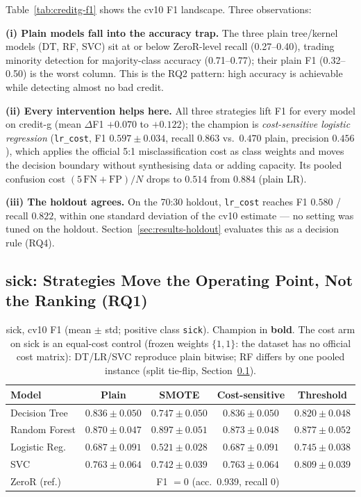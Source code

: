 Table~\ref{tab:creditg-f1} shows the cv10 F1 landscape. Three observations:

\textbf{(i) Plain models fall into the accuracy trap.} The three plain tree/kernel models (DT, RF, SVC) sit at or below ZeroR-level recall (0.27--0.40), trading minority detection for majority-class accuracy (0.71--0.77); their plain F1 (0.32--0.50) is the worst column. This is the RQ2 pattern: high accuracy is achievable while detecting almost no bad credit.

\textbf{(ii) Every intervention helps here.} All three strategies lift F1 for every model on credit-g (mean $\Delta$F1 $+0.070$ to $+0.122$); the champion is \emph{cost-sensitive logistic regression} (\texttt{lr\_cost}, F1 $0.597\pm0.034$, recall $0.863$ vs.\ $0.470$ plain, precision $0.456$), which applies the official 5:1 misclassification cost as class weights and moves the decision boundary without synthesising data or adding capacity. Its pooled confusion cost $(5\,\mathrm{FN}+\mathrm{FP})/N$ drops to $0.514$ from $0.884$ (plain LR).

\textbf{(iii) The holdout agrees.} On the 70:30 holdout, \texttt{lr\_cost} reaches F1 $0.580$ / recall $0.822$, within one standard deviation of the cv10 estimate --- no setting was tuned on the holdout. Section~\ref{sec:results-holdout} evaluates this as a decision rule (RQ4).

\subsection{sick: Strategies Move the Operating Point, Not the Ranking (RQ1)}
\label{sec:results-sick}

\begin{table}[H]
\centering
\caption{sick, cv10 F1 (mean $\pm$ std; positive class \texttt{sick}). Champion in \textbf{bold}. The cost arm on sick is an equal-cost control (frozen weights $\{1,1\}$: the dataset has no official cost matrix): DT/LR/SVC reproduce plain bitwise; RF differs by one pooled instance (split tie-flip, Section~\ref{sec:results-sick}).}
\label{tab:sick-f1}
\begin{tabular}{lcccc}
\toprule
Model & Plain & SMOTE & Cost-sensitive & Threshold \\
\midrule
Decision Tree & $0.836\pm0.050$ & $0.747\pm0.050$ & $0.836\pm0.050$ & $0.820\pm0.048$ \\
Random Forest & $0.870\pm0.047$ & $\mathbf{0.897\pm0.051}$ & $0.873\pm0.048$ & $0.877\pm0.052$ \\
Logistic Reg. & $0.687\pm0.091$ & $0.521\pm0.028$ & $0.687\pm0.091$ & $0.745\pm0.038$ \\
SVC & $0.763\pm0.064$ & $0.742\pm0.039$ & $0.763\pm0.064$ & $0.809\pm0.039$ \\
\midrule
ZeroR (ref.) & \multicolumn{4}{c}{F1 $=0$ (acc.\ 0.939, recall 0)} \\
\bottomrule
\end{tabular}
\end{table}


